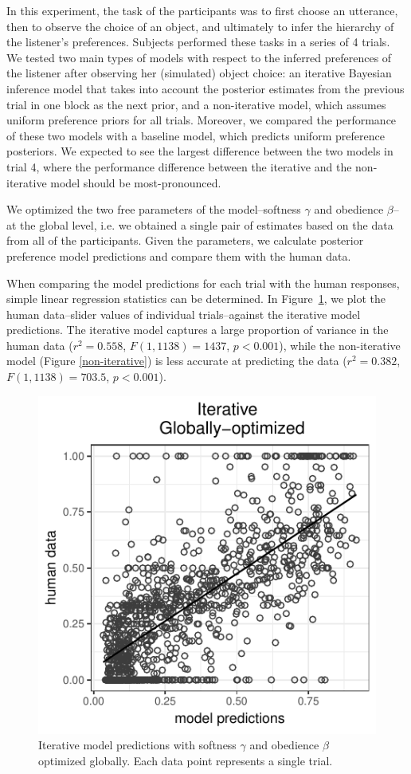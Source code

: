 \documentclass[10pt,a4paper]{article}
\begin{document}
In this experiment, the task of the participants was to first choose an utterance, then to observe the choice of an object, and ultimately to infer the hierarchy of the listener's preferences. Subjects performed these tasks in a series of 4 trials. We tested two main types of models with respect to the inferred preferences of the listener after observing her (simulated) object choice: an iterative Bayesian inference model that takes into account the posterior estimates from the previous trial in one block as the next prior, and a non-iterative model, which assumes uniform preference priors for all trials.
Moreover, we compared the performance of these two models with a baseline model, which predicts uniform preference posteriors. 
We expected to see the largest difference between the two models in trial 4, where the performance difference between the iterative and the non-iterative model should be most-pronounced.


We optimized the two free parameters of the model--softness $\gamma$ and obedience $\beta$--at the global level, i.e. we obtained a single pair of estimates based on the data from all of the participants. 
Given the parameters, we calculate posterior preference model predictions and compare them with the human data. 

When comparing the model predictions for each trial with the human responses, simple linear regression statistics can be determined. 
In Figure~\ref{iterative}, we plot the human data--slider values of individual trials--against the iterative model predictions. 
The iterative model captures a large proportion of variance in the human data  ($r^2=0.558$, $F(1,1138) = 1437$, $p<0.001$), while the non-iterative model (Figure \ref{non-iterative}) is less accurate at predicting the data  ($r^2=0.382$, $F(1,1138) = 703.5$, $p<0.001$).


\begin{figure}[t]
	\centering
	\includegraphics[width=.8\linewidth]{images/m4.pdf}
	\caption{Iterative model predictions with softness $\gamma$ and obedience $\beta$ optimized globally. Each data point represents a single trial.}	
	\label{iterative}
\end{figure}
\end{document}
